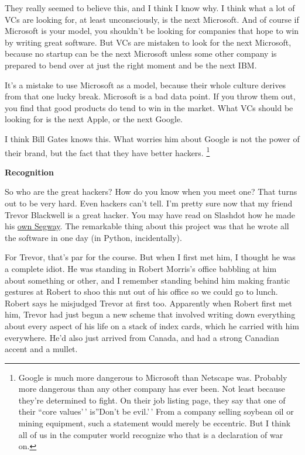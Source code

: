 They really seemed to believe this, and I think I know why. I think what
a lot of VCs are looking for, at least unconsciously, is the next
Microsoft. And of course if Microsoft is your model, you shouldn't be
looking for companies that hope to win by writing great software. But
VCs are mistaken to look for the next Microsoft, because no startup can
be the next Microsoft unless some other company is prepared to bend over
at just the right moment and be the next IBM.

It's a mistake to use Microsoft as a model, because their whole culture
derives from that one lucky break. Microsoft is a bad data point. If you
throw them out, you find that good products do tend to win in the
market. What VCs should be looking for is the next Apple, or the next
Google.

I think Bill Gates knows this. What worries him about Google is not the
power of their brand, but the fact that they have better hackers.
\footnote{Google is much more dangerous to Microsoft than Netscape was.
Probably more dangerous than any other company has ever been. Not least
because they're determined to fight. On their job listing page, they say
that one of their ``core values'\,' is''Don't be evil.'\,' From a
company selling soybean oil or mining equipment, such a statement would
merely be eccentric. But I think all of us in the computer world
recognize who that is a declaration of war on.}

\textbf{Recognition}

So who are the great hackers? How do you know when you meet one? That
turns out to be very hard. Even hackers can't tell. I'm pretty sure now
that my friend Trevor Blackwell is a great hacker. You may have read on
Slashdot how he made his \href{http://www.tlb.org/scooter.html}{own
Segway}. The remarkable thing about this project was that he wrote all
the software in one day (in Python, incidentally).

For Trevor, that's par for the course. But when I first met him, I
thought he was a complete idiot. He was standing in Robert Morris's
office babbling at him about something or other, and I remember standing
behind him making frantic gestures at Robert to shoo this nut out of his
office so we could go to lunch. Robert says he misjudged Trevor at first
too. Apparently when Robert first met him, Trevor had just begun a new
scheme that involved writing down everything about every aspect of his
life on a stack of index cards, which he carried with him everywhere.
He'd also just arrived from Canada, and had a strong Canadian accent and
a mullet.

